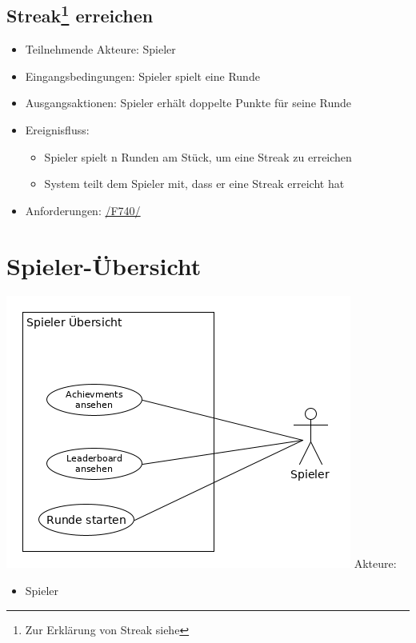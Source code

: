 \documentclass[a4paper]{scrreprt}
\begin{document}
    \subsection[Streak erreichen]{Streak\footnote{Zur Erklärung von Streak siehe } erreichen}
    \begin{itemize}
        \item Teilnehmende Akteure: \Gls{Spieler}
        \item Eingangsbedingungen: \Gls{Spieler} spielt eine Runde
        \item Ausgangsaktionen: \Gls{Spieler} erhält doppelte Punkte für seine Runde
        \item Ereignisfluss:
        \begin{itemize}
            \item \Gls{Spieler} spielt n Runden am Stück, um eine Streak zu erreichen
            \item System teilt dem \Gls{Spieler} mit, dass er eine Streak erreicht hat
        \end{itemize}
        \item Anforderungen: \hyperlink{F740}{/F740/}
    \end{itemize}
    
    \section{Spieler-Übersicht}
    \includegraphics[width=\textwidth]{uml/export/Spieler_Ubersicht.png}
    Akteure: 
    \begin{itemize}
    \item \Gls{Spieler}
    \end{itemize}
\end{document}
